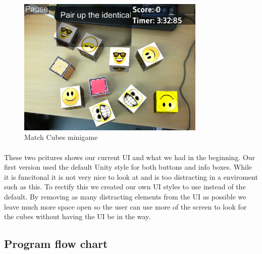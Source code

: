 \begin{figure}[ht]
	\capstart
	\centering
	\includegraphics[width=0.8\textwidth]{images/MatchCubes}
	\caption{Match Cubes minigame}
	\label{fig:match_cubes}
\end{figure}

\paragraph{}
These two pcitures shows our current UI and what we had in the beginning.
Our first version used the default Unity style for both buttons and info boxes.
While it is funcitonal it is not very nice to look at and is too distracting in a enviroment such as this.
To rectify this we created our own UI styles to use instead of the default.
By removing as many distracting elements from the UI as possible we leave much more space open so the user can use more of the
screen to look for the cubes without having the UI be in the way.



\newpage
\subsection{Program flow chart}

